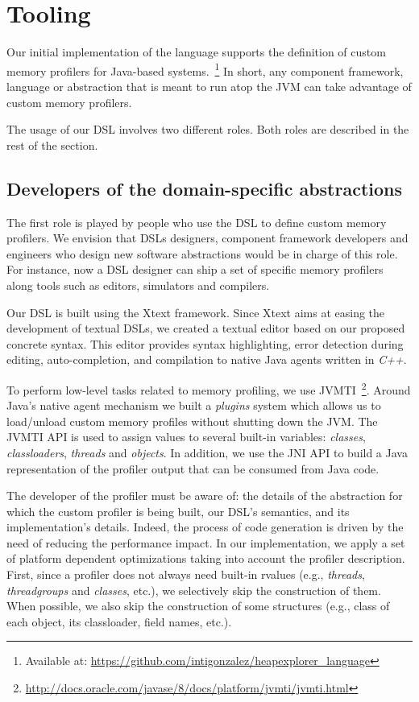 \section{Tooling}\label{sec:implementation}

Our initial implementation of the language supports the definition of custom memory profilers for Java-based systems.~\footnote{Available at: \url{https://github.com/intigonzalez/heapexplorer\_language}}
In short, any component framework, language or abstraction that is meant to run atop the JVM can take advantage of custom memory profilers.

The usage of our DSL involves two different roles.
Both roles are described in the rest of the section.


\subsection{Developers of the domain-specific abstractions}

The first role is played by people who use the DSL to define custom memory profilers.
We envision that DSLs designers, component framework developers and engineers who design new software abstractions would be in charge of this role.
For instance, now a DSL designer can ship a set of specific memory profilers along tools such as editors, simulators and compilers. 

Our DSL is built using the Xtext framework.
Since Xtext aims at easing the development of textual DSLs, we created a textual editor based on our proposed concrete syntax.
This editor provides syntax highlighting, error detection during editing, auto-completion, and compilation to native Java agents written in \textit{C++}.

To perform low-level tasks related to memory profiling, we use JVMTI~\footnote{\url{http://docs.oracle.com/javase/8/docs/platform/jvmti/jvmti.html}}.
Around Java's native agent mechanism we built a \textit{plugins} system which allows us to load/unload custom memory profiles without shutting down the JVM.
The JVMTI API is used to assign values to several built-in variables: \textit{classes}, \textit{classloaders}, \textit{threads} and \textit{objects}.
In addition, we use the JNI API to build a Java representation of the profiler output that can be consumed from Java code.

The developer of the profiler must be aware of: the details of the abstraction for which the custom profiler is being built, our DSL's semantics, and its implementation's details.
Indeed, the process of code generation is driven by the need of reducing the performance impact.
In our implementation, we apply a set of platform dependent optimizations taking into account the profiler description.
First, since a profiler does not always need built-in rvalues (e.g., \textit{threads}, \textit{threadgroups} and \textit{classes}, etc.), we selectively skip the construction of them.
When possible, we also skip the construction of some structures (e.g., class of each object, its classloader, field names, etc.).

